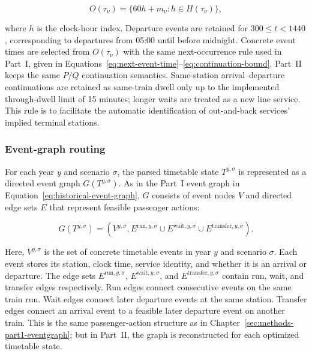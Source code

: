 \documentclass[preprint,12pt]{elsarticle}
\begin{document}
\begin{equation}
O(\tau_\nu)=\{60h+m_\nu:h\in H(\tau_\nu)\},
\label{eq:part2-occurrence-set}
\end{equation}

where \(h\) is the clock-hour index. Departure events are retained for \(300\le t<1440\), corresponding to departures from 05:00 until before midnight. Concrete event times are selected from \(O(\tau_\nu)\) with the same next-occurrence rule used in Part~I, given in Equations~\eqref{eq:next-event-time}--\eqref{eq:continuation-bound}. Part~II keeps the same \(P/Q\) continuation semantics. Same-station arrival--departure continuations are retained as same-train dwell only up to the implemented through-dwell limit of 15 minutes; longer waits are treated as a new line service. This rule is to facilitate the automatic identification of out-and-back services' implied terminal stations.
\newpage
\subsubsection{Event-graph routing}\label{sec:methods-part2-event-graph-search}
For each year \(y\) and scenario \(\sigma\), the parsed timetable state \(T^{y,\sigma}\) is represented as a directed event graph \(G(T^{y,\sigma})\). As in the Part~I event graph in Equation~\eqref{eq:historical-event-graph}, \(G\) consists of event nodes \(V\) and directed edge sets \(E\) that represent feasible passenger actions:

\begin{equation}
G(T^{y,\sigma})=
\left(
V^{y,\sigma},
E^{\mathrm{run},y,\sigma}
\cup
E^{\mathrm{wait},y,\sigma}
\cup
E^{\mathrm{transfer},y,\sigma}
\right).
\label{eq:part2-scenario-graph}
\end{equation}

Here, \(V^{y,\sigma}\) is the set of concrete timetable events in year \(y\) and scenario \(\sigma\). Each event stores its station, clock time, service identity, and whether it is an arrival or departure. The edge sets \(E^{\mathrm{run},y,\sigma}\), \(E^{\mathrm{wait},y,\sigma}\), and \(E^{\mathrm{transfer},y,\sigma}\) contain run, wait, and transfer edges respectively. Run edges connect consecutive events on the same train run. Wait edges connect later departure events at the same station. Transfer edges connect an arrival event to a feasible later departure event on another train. This is the same passenger-action structure as in Chapter~\ref{sec:methods-part1-eventgraph}; but in Part~II, the graph is reconstructed for each optimized timetable state.
\end{document}
